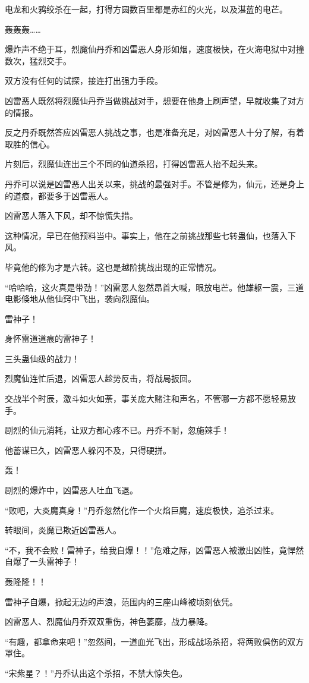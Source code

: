 \begin{this_body}
电龙和火鸦绞杀在一起，打得方圆数百里都是赤红的火光，以及湛蓝的电芒。

轰轰轰……

爆炸声不绝于耳，烈魔仙丹乔和凶雷恶人身形如烟，速度极快，在火海电狱中对撞数次，猛烈交手。

双方没有任何的试探，接连打出强力手段。

凶雷恶人既然将烈魔仙丹乔当做挑战对手，想要在他身上刷声望，早就收集了对方的情报。

反之丹乔既然答应凶雷恶人挑战之事，也是准备充足，对凶雷恶人十分了解，有着取胜的信心。

片刻后，烈魔仙连出三个不同的仙道杀招，打得凶雷恶人抬不起头来。

丹乔可以说是凶雷恶人出关以来，挑战的最强对手。不管是修为，仙元，还是身上的道痕，都要多于凶雷恶人。

凶雷恶人落入下风，却不惊慌失措。

这种情况，早已在他预料当中。事实上，他在之前挑战那些七转蛊仙，也落入下风。

毕竟他的修为才是六转。这也是越阶挑战出现的正常情况。

“哈哈哈，这火真是带劲！”凶雷恶人忽然昂首大喊，眼放电芒。他雄躯一震，三道电影倏地从他仙窍中飞出，袭向烈魔仙。

雷神子！

身怀雷道道痕的雷神子！

三头蛊仙级的战力！

烈魔仙连忙后退，凶雷恶人趁势反击，将战局扳回。

交战半个时辰，激斗如火如荼，事关庞大赌注和声名，不管哪一方都不愿轻易放手。

剧烈的仙元消耗，让双方都心疼不已。丹乔不耐，忽施辣手！

他蓄谋已久，凶雷恶人躲闪不及，只得硬拼。

轰！

剧烈的爆炸中，凶雷恶人吐血飞退。

“败吧，大炎魔真身！”丹乔忽然化作一个火焰巨魔，速度极快，追杀过来。

转眼间，炎魔已欺近凶雷恶人。

“不，我不会败！雷神子，给我自爆！！”危难之际，凶雷恶人被激出凶性，竟悍然自爆了一头雷神子！

轰隆隆！！

雷神子自爆，掀起无边的声浪，范围内的三座山峰被顷刻依凭。

凶雷恶人、烈魔仙丹乔双双重伤，神色萎靡，战力暴降。

“有趣，都拿命来吧！”忽然间，一道血光飞出，形成战场杀招，将两败俱伤的双方罩住。

“宋紫星？！”丹乔认出这个杀招，不禁大惊失色。

\end{this_body}

